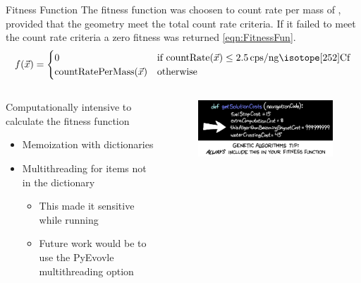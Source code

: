 \documentclass[compress]{beamer}
\begin{document}
\begin{frame}{Fitness Function}
The fitness function was choosen to count rate per mass of , provided that the geometry meet the total count rate criteria.
If it failed to meet the count rate criteria a zero fitness was returned \eqref{eqn:FitnessFun}.
	\tiny
	\begin{align}
			\label{eqn:FitnessFun}
			f(\vec{x})
			= \begin{cases}
			0 & \text{if}~\text{countRate}(\vec{x}) \leq \SI{2.5}{cps\per\nano\gram\iso[252]{Cf}} \\
			\text{countRatePerMass}(\vec{x}) & \text{otherwise}
			\end{cases}
	\end{align}
\begin{columns}[onlytextwidth]
  \begin{column}{0.5\textwidth}
\small
	Computationally intensive to calculate the fitness function 
	\begin{itemize}
		\item Memoization with dictionaries
		\item Multithreading for items not in the dictionary
		\tiny
		\begin{itemize}
			\item This made it sensitive while running
			\item Future work would be to use the PyEvovle multithreading option
		\end{itemize}
	\end{itemize}
	\end{column}
	\begin{column}{0.4\textwidth}
    \begin{figure}
      \centering
      \includegraphics[width=\textwidth]{genetic_algorithms}
    \end{figure}
	\end{column}
\end{columns}
\end{frame}
\end{document}
